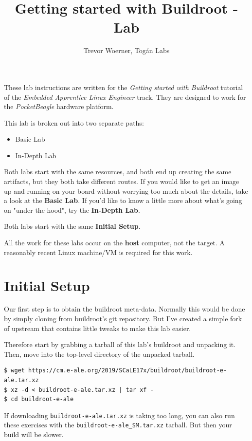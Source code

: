 \documentclass[a4paper,12pt,obeyspaces,spaces,hyphens]{article}
\title{Getting started with Buildroot - Lab}
\author{Trevor Woerner, Togán Labs}
\begin{document}
\maketitle
\thispagestyle{fancy}

These lab instructions are written for the {\em Getting started with
  Buildroot} tutorial of the {\em Embedded Apprentice Linux Engineer}
track. They are designed to work for the {\em PocketBeagle} hardware
platform.

This lab is broken out into two separate paths:
\begin{itemize}
  \item Basic Lab
  \item In-Depth Lab
\end{itemize}

Both labs start with the same resources, and both end up creating the same
artifacts, but they both take different routes. If you would like to get
an image up-and-running on your board without worrying too much about the
details, take a look at the {\bf Basic Lab}. If you'd like to know a little
more about what's going on "under the hood", try the {\bf In-Depth Lab}.

Both labs start with the same {\bf Initial Setup}.

All the work for these labs occur on the {\bf host} computer, not the target.
A reasonably recent Linux machine/VM is required for this work.

\section{Initial Setup}

Our first step is to obtain the buildroot meta-data. Normally this would be
done by simply cloning from buildroot's git repository. But I've created a
simple fork of upstream that contains little tweaks to make this lab easier.

Therefore start by grabbing a tarball of this lab's buildroot and unpacking
it. Then, move into the top-level directory of the unpacked tarball.

\begin{verbatim}
$ wget https://cm.e-ale.org/2019/SCaLE17x/buildroot/buildroot-e-ale.tar.xz
$ xz -d < buildroot-e-ale.tar.xz | tar xf -
$ cd buildroot-e-ale
\end{verbatim}

If downloading \texttt{buildroot-e-ale.tar.xz} is taking too long, you can
also run these exercises with the \texttt{buildroot-e-ale\_SM.tar.xz} tarball.
But then your build will be slower.
\end{document}
